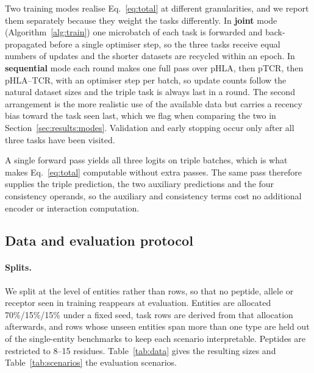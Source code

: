 \documentclass[webpdf,modern,large,namedate]{oup-authoring-template}
\theoremstyle{thmstyleone}
\theoremstyle{thmstyletwo}
\theoremstyle{thmstylethree}
\newcommand{\PH}{pHLA}
\newcommand{\PT}{pTCR}
\newcommand{\PHT}{pHLA--TCR}
\begin{document}
Two training modes realise Eq.~\eqref{eq:total} at different granularities, and
we report them separately because they weight the tasks differently. In
\textbf{joint} mode (Algorithm~\ref{alg:train}) one microbatch of each task is
forwarded and back-propagated before a single optimiser step, so the three
tasks receive equal numbers of updates and the shorter datasets are recycled
within an epoch. In \textbf{sequential} mode each round makes one full pass over
\PH{}, then \PT{}, then \PHT{}, with an optimiser step per batch, so update
counts follow the natural dataset sizes and the triple task is always last in a
round. The second arrangement is the more realistic use of the available data
but carries a recency bias toward the task seen last, which we flag when
comparing the two in Section~\ref{sec:results:modes}. Validation and early
stopping occur only after all three tasks have been visited.

A single forward pass yields all three logits on triple batches, which is what
makes Eq.~\eqref{eq:total} computable without extra passes. The same pass
therefore supplies the triple prediction, the two auxiliary predictions and the
four consistency operands, so the auxiliary and consistency terms cost no
additional encoder or interaction computation.

\subsection{Data and evaluation protocol}\label{sec:method:data}

\paragraph{Splits.}
We split at the level of entities rather than rows, so that no peptide, allele
or receptor seen in training reappears at evaluation. Entities are allocated
70\%/15\%/15\% under a fixed seed, task rows are derived from that allocation
afterwards, and rows whose unseen entities span more than one type are held out
of the single-entity benchmarks to keep each scenario interpretable. Peptides
are restricted to 8--15 residues. Table~\ref{tab:data} gives the resulting
sizes and Table~\ref{tab:scenarios} the evaluation scenarios.
\end{document}
